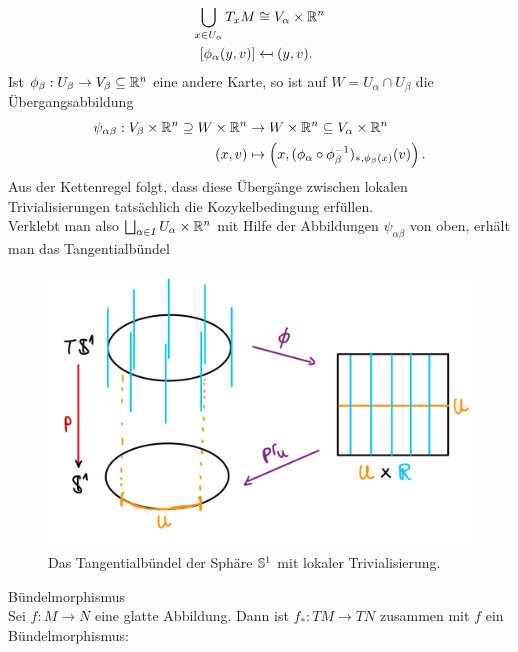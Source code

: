 \begin{align}
\bigcup_{x \in U_\alpha} T_xM &\cong V_\alpha \times \mathbb{R}^n \\
[\phi_\alpha (y, v)] &\mapsfrom (y, v).
\end{align}
Ist $\phi_\beta: U_\beta \to V_\beta \subseteq \mathbb{R}^n$ eine andere Karte, so ist auf $W=U_\alpha \cap U_\beta$ die Übergangsabbildung
\begin{align}
\psi_{\alpha \beta}: V_\beta \times \mathbb{R}^n \supseteq W \times \mathbb{R}^n &\to W \times \mathbb{R}^n \subseteq V_\alpha \times \mathbb{R}^n \\
(x, v) &\mapsto \left( x, (\phi_\alpha \circ \phi_\beta^{-1})_{\ast, \phi_\beta(x)} (v) \right).
\end{align}
Aus der Kettenregel folgt, dass diese Übergänge zwischen lokalen Trivialisierungen tatsächlich die Kozykelbedingung erfüllen.\\
Verklebt man also 
$\bigsqcup_{\alpha \in I} U_\alpha \times \mathbb{R}^n$ mit Hilfe der Abbildungen $\psi_{\alpha \beta}$ von oben, erhält man das Tangentialbündel
\begin{figure}[H]
\label{fig:tangentialbund}
\centering
\includegraphics[width=0.4\linewidth]{Bilder/tangentialbundel.png}
\caption{Das Tangentialbündel der Sphäre $\mathbb{S}^1$ mit lokaler Trivialisierung.}
\end{figure}
\begin{beispiel}Bündelmorphismus\\
Sei $f: M \to N$ eine glatte Abbildung. Dann ist $f_\ast:TM \to TN$ zusammen mit $f$ ein Bündelmorphismus:
\begin{center}
\end{center}
\end{beispiel}
